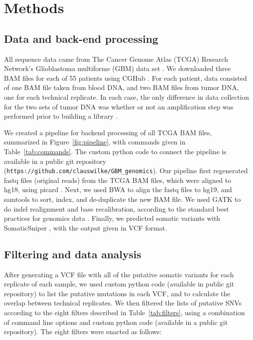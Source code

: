 \documentclass[11 pt]{article} %
\begin{document}
\section*{Methods}

\subsection*{Data and back-end processing}

All sequence data came from The Cancer Genome Atlas (TCGA) Research Network's Glioblastoma multiforme (GBM) data set \citep{TCGA-GBM}. We downloaded three BAM files for each of 55 patients using CGHub \citep{CGHub}. For each patient, data consisted of one BAM file taken from blood DNA, and two BAM files from tumor DNA, one for each technical replicate. In each case, the only difference in data collection for the two sets of tumor DNA was whether or not an amplification step was performed prior to building a library \citep{TCGA-GBM}. 

We created a pipeline for backend processing of all TCGA BAM files, summarized in Figure~\ref{fig:pipeline}, with commands given in Table~\ref{tab:commands}. The custom python code to connect the pipeline is available in a public 
git repository (\texttt{https://github.com/clauswilke/GBM\_genomics}). Our pipeline first regenerated fastq files (original reads) from the TCGA BAM files, which were aligned to hg18, using picard \citep{picard}. Next, we used BWA \citep{bwa} to align the fastq files to hg19, and samtools \citep{SAMtools} to sort, index, and de-duplicate the new BAM file. We used GATK \citep{GATK} to do indel realignment and base recalibration, according to the standard best practices for genomics data \citep{best-practices}. Finally, we predicted somatic variants with SomaticSniper \citep{SomaticSniper}, with the output given in VCF format.

\subsection*{Filtering and data analysis}

After generating a VCF file with all of the putative somatic variants for each replicate of each sample, we used custom python code (available in public git repository) to list the putative mutations in each VCF, and to calculate the overlap between technical replicates. We then filtered the lists of putative SNVs according to the eight filters described in Table~\ref{tab:filters}, using a combination of command line options and custom python code (available in a public git repository). The eight filters were enacted as follows: 
\end{document}
